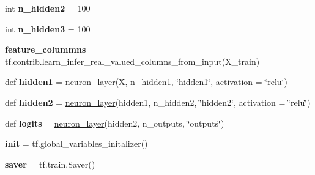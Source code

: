 \begin{DoxyCompactItemize}
int {\bfseries n\+\_\+hidden2} = 100
\item
\mbox{\label{namespacechemistry2quant_1_1chem2quant__analysis_a892749c0643a074cbfe4c740cf958a44}}
int {\bfseries n\+\_\+hidden3} = 100
\item
\mbox{\label{namespacechemistry2quant_1_1chem2quant__analysis_a5aea0d4e1c6fbf74d540809ab32cb821}}
{\bfseries feature\+\_\+colummns} = tf.\+contrib.\+learn\+\_\+infer\+\_\+real\+\_\+valued\+\_\+columns\+\_\+from\+\_\+input(X\+\_\+train)
\item
\mbox{\label{namespacechemistry2quant_1_1chem2quant__analysis_a96f8355fe78c70265e0b51b533ca9567}}
def {\bfseries hidden1} = \hyperlink{namespacechemistry2quant_1_1chem2quant__analysis_af45b049d6a04c87f9f473f3356dda58c}{neuron\+\_\+layer}(X, n\+\_\+hidden1, \char`\"{}hidden1\char`\"{}, activation = \char`\"{}relu\char`\"{})
\item
\mbox{\label{namespacechemistry2quant_1_1chem2quant__analysis_a36b629c603687948067d5de7b94d4d82}}
def {\bfseries hidden2} = \hyperlink{namespacechemistry2quant_1_1chem2quant__analysis_af45b049d6a04c87f9f473f3356dda58c}{neuron\+\_\+layer}(hidden1, n\+\_\+hidden2, \char`\"{}hidden2\char`\"{}, activation = \char`\"{}relu\char`\"{})
\item
\mbox{\label{namespacechemistry2quant_1_1chem2quant__analysis_a643325fa63e35ef454fd7104ed405b9a}}
def {\bfseries logits} = \hyperlink{namespacechemistry2quant_1_1chem2quant__analysis_af45b049d6a04c87f9f473f3356dda58c}{neuron\+\_\+layer}(hidden2, n\+\_\+outputs, \char`\"{}outputs\char`\"{})
\item
\mbox{\label{namespacechemistry2quant_1_1chem2quant__analysis_adf0eae946dfb0878ef93535ee235a05e}}
{\bfseries init} = tf.\+global\+\_\+variables\+\_\+initalizer()
\item
\mbox{\label{namespacechemistry2quant_1_1chem2quant__analysis_ad07dd3a7e649a815ed01efbbd351b3ed}}
{\bfseries saver} = tf.\+train.\+Saver()
\end{DoxyCompactItemize}


